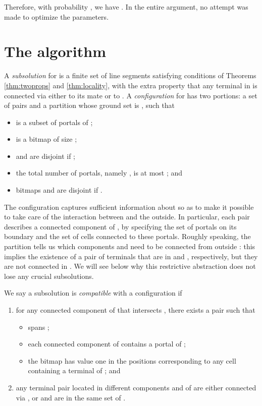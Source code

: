 \documentclass[extras,11pt]{article} \usepackage{fullpage}
\theoremstyle{mytheorem}
\begin{document}
Therefore, with probability , we have .
In the entire argument, no attempt was made to optimize the parameters.







\section{The algorithm}\label{sec:algo}
A \emph{subsolution} for  is a finite set of line segments 
satisfying conditions of Theorems \ref{thm:twoprops} and \ref{thm:locality},
with the extra property that any terminal  in  is connected via  either to its mate or to .
A \emph{configuration}  for  has two portions:
a set  of pairs  and a partition  whose ground set is , such that
\begin{itemize}
\item  is a subset of portals of ;
\item  is a bitmap of size ;
\item  and  are disjoint if ;
\item the total number of portals, namely , is at most ; and
\item bitmaps  and  are disjoint if .
\end{itemize}
The configuration captures sufficient information about  so as to make it possible to take care of the interaction between  and the outside.
In particular, each pair  describes a connected component of , by specifying the set of portals on its boundary and the set of cells connected to these portals.
Roughly speaking, the partition  tells us which components  and  need to be connected from outside :
 this implies the existence of a pair of terminals that are in  and , respectively, but they are not connected in .
We will see below why this restrictive abstraction does not lose any crucial subsolutions.


We say a subsolution  is \emph{compatible} with a  configuration  if
\begin{enumerate}
\item
for any connected component  of  that intersects ,
 there exists a pair  such that
\begin{itemize}
\item  spans ;
\item each connected component of  contains a portal of ;
\item the bitmap  has value one in the positions corresponding to any cell  containing a terminal  of ; and
\end{itemize}
\vspace{-1mm}
\item
 any terminal pair located in different components  and  of  are either connected via ,
 or  and  are in the same set of .
\end{enumerate}
\end{document}
